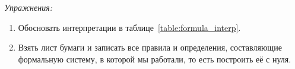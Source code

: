 {\it Упражнения:}
\begin{enumerate}
	\item{}Обосновать интерпретации в таблице~\ref{table:formula_interp}.
	\item{}Взять лист бумаги и записать все правила и определения, составляющие
		формальную систему, в которой мы работали, то есть построить её с нуля.
\end{enumerate}


